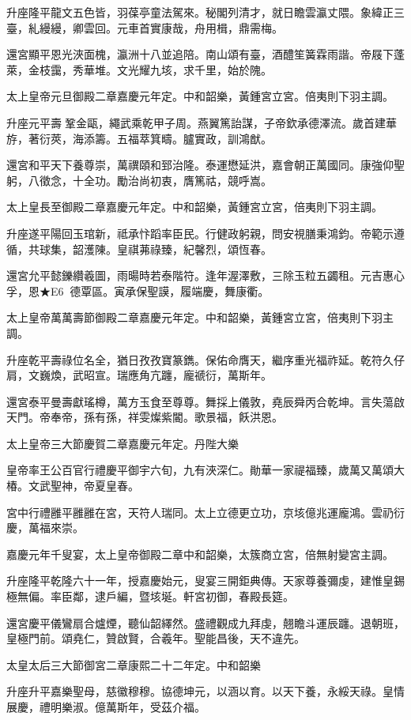 \begin{pinyinscope}
升座隆平龍文五色皆，羽葆亭童法駕來。秘閣列清才，就日瞻雲瀛丈隈。象緯正三臺，糺縵縵，卿雲回。元車首實康哉，舟用楫，鼎需梅。

還宮顯平恩光浹面槐，瀛洲十八並追陪。南山頌有臺，酒醴笙簧霖雨諧。帝屐下蓬萊，金枝靄，秀華堆。文光耀九垓，求千里，始於隗。

太上皇帝元旦御殿二章嘉慶元年定。中和韶樂，黃鍾宮立宮。倍夷則下羽主調。

升座元平壽鞏金甌，繩武乘乾甲子周。燕翼篤詒謀，子帝欽承德澤流。歲首建華斿，著衍莢，海添籌。五福萃箕疇。臚實政，訓鴻猷。

還宮和平天下養尊崇，萬禩頤和郅治隆。泰運懋延洪，嘉會朝正萬國同。康強仰聖躬，八徵念，十全功。勵治尚初衷，膺篤祜，競呼嵩。

太上皇長至御殿二章嘉慶元年定。中和韶樂，黃鍾宮立宮，倍夷則下羽主調。

升座遂平陽回玉琯新，祗承忭蹈率臣民。行健政躬親，問安視膳秉鴻鈞。帝範示遵循，共球集，韶濩陳。皇祺茀祿臻，紀馨烈，頌恆春。

還宮允平懿鑠纘羲圖，雨暘時若泰階符。逢年渥澤敷，三除玉粒五蠲租。元吉惠心孚，恩★E6，德覃區。寅承保聖謨，履端慶，舞康衢。

太上皇帝萬萬壽節御殿二章嘉慶元年定。中和韶樂，黃鍾宮立宮，倍夷則下羽主調。

升座乾平壽祿位名全，猶日孜孜寶篆鐫。保佑命膺天，繼序重光福祚延。乾符久仔肩，文巍煥，武昭宣。瑞應角亢躔，龐禠衍，萬斯年。

還宮泰平曼壽獻瑤樽，萬方玉食至尊尊。舞採上儀敦，堯辰舜丙合乾坤。言失蕩啟天門。帝奉帝，孫有孫，祥雯燦紫閽。歌景福，飫洪恩。

太上皇帝三大節慶賀二章嘉慶元年定。丹陛大樂

皇帝率王公百官行禮慶平御宇六旬，九有浹深仁。勛華一家禔福臻，歲萬又萬頌大椿。文武聖神，帝夏皇春。

宮中行禮雝平雝雝在宮，天符人瑞同。太上立德更立功，京垓億兆運龐鴻。雲礽衍慶，萬福來崇。

嘉慶元年千叟宴，太上皇帝御殿二章中和韶樂，太簇商立宮，倍無射變宮主調。

升座隆平乾隆六十一年，授嘉慶始元，叟宴三開鉅典傳。天家尊養彌虔，建惟皇錫極無偏。率臣鄰，逮戶編，暨垓埏。軒宮初御，春殿長筵。

還宮慶平儀鸞扇合爐煙，聽仙韶繹然。盛禮觀成九拜虔，翹瞻斗運辰躔。退朝班，皇極門前。頌堯仁，贊啟賢，合羲年。聖能昌後，天不違先。

太皇太后三大節御宮二章康熙二十二年定。中和韶樂

升座升平嘉樂聖母，慈徽穆穆。協德坤元，以涵以育。以天下養，永綏天祿。皇情展慶，禮明樂淑。億萬斯年，受茲介福。


\end{pinyinscope}
